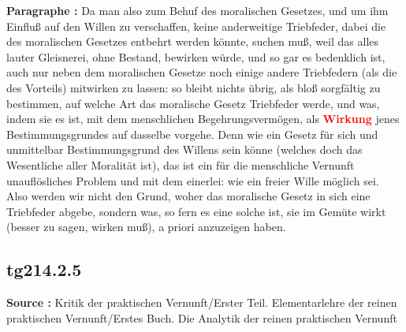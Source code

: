 \documentclass[a4paper,12pt,twoside]{book}
\newcommand{\match}[1]{\textcolor{red}{\textbf{#1}}}
\begin{document}
	\noindent\textbf{Paragraphe : }Da man also zum Behuf des moralischen Gesetzes, und um ihm Einfluß auf den Willen zu verschaffen, keine anderweitige Triebfeder, dabei die des moralischen Gesetzes entbehrt werden könnte, suchen muß, weil das alles lauter Gleisnerei, ohne Bestand, bewirken würde, und so gar es bedenklich ist, auch nur neben dem moralischen Gesetze noch einige andere Triebfedern (als die des Vorteils) mitwirken zu lassen: so bleibt nichts übrig, als bloß sorgfältig zu bestimmen, auf welche Art das moralische Gesetz Triebfeder werde, und was, indem sie es ist, mit dem menschlichen Begehrungsvermögen, als \match{Wirkung} jenes Bestimmungsgrundes auf dasselbe vorgehe. Denn wie ein Gesetz für sich und unmittelbar Bestimmungsgrund des Willens sein könne (welches doch das Wesentliche aller Moralität ist), das ist ein für die menschliche Vernunft unauflösliches Problem und mit dem einerlei: wie ein freier Wille möglich sei. Also werden wir nicht den Grund, woher das moralische Gesetz in sich eine Triebfeder abgebe, sondern was, so fern es eine solche ist, sie im Gemüte wirkt (besser zu sagen, wirken muß), a priori anzuzeigen haben. 
	
	\subsection*{tg214.2.5} 
	\textbf{Source : }Kritik der praktischen Vernunft/Erster Teil. Elementarlehre der reinen praktischen Vernunft/Erstes Buch. Die Analytik der reinen praktischen Vernunft\\  
	
\end{document}
